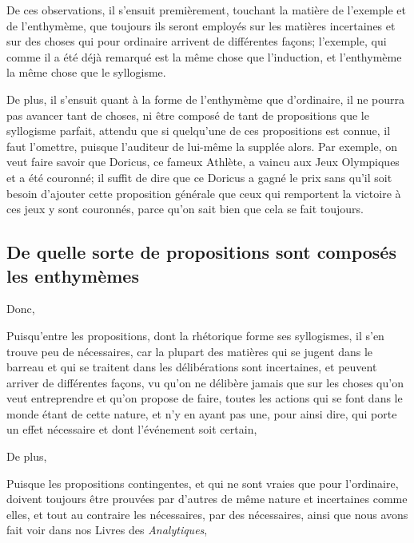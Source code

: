 \medbreak

De ces observations, il s'ensuit premièrement, touchant la matière de l'exemple et de l'enthymème, que toujours ils seront employés sur les matières
incertaines et sur des choses qui pour ordinaire arrivent de différentes façons; l'exemple, qui comme il a été déjà remarqué est la même chose
que l'induction, et l'enthymème la même chose que le syllogisme.

De plus, il s'ensuit quant à la forme de l'enthymème que d'ordinaire, il ne pourra pas avancer tant de choses, ni être composé de tant de propositions
que le syllogisme parfait, attendu que si quelqu'une de ces propositions est connue, il faut l'omettre, puisque l'auditeur de lui-même la supplée alors.
Par exemple, on veut faire savoir que Doricus, ce fameux Athlète, a vaincu aux Jeux Olympiques et a été couronné; il suffit de dire que ce Doricus a
gagné le prix sans qu'il soit besoin d'ajouter cette proposition générale que ceux qui remportent la victoire à ces jeux y sont couronnés, parce qu'on
sait bien que cela se fait toujours. 

\subsection{De quelle sorte de propositions sont composés les enthymèmes}

Donc,

\begin{emphpar}
      Puisqu'entre les propositions, dont la rhétorique forme ses syllogismes, il s'en trouve peu de nécessaires, car la plupart des matières
      qui se jugent dans le barreau et qui se traitent dans les délibérations sont incertaines, et peuvent arriver de différentes façons, vu
       qu'on ne délibère jamais que sur les choses qu'on veut entreprendre et qu'on propose de faire, toutes les actions qui se font dans le
       monde étant de cette nature, et n'y en ayant pas une, pour ainsi dire, qui porte un effet nécessaire et dont l'événement soit certain,
\end{emphpar}

De plus,

\begin{emphpar}
      Puisque les propositions contingentes, et qui ne sont vraies que pour l'ordinaire, doivent toujours être prouvées par d'autres de même nature
      et incertaines comme elles, et tout au contraire les nécessaires, par des nécessaires, ainsi que nous avons fait voir dans nos Livres des
      \emph{Analytiques},
\end{emphpar}

